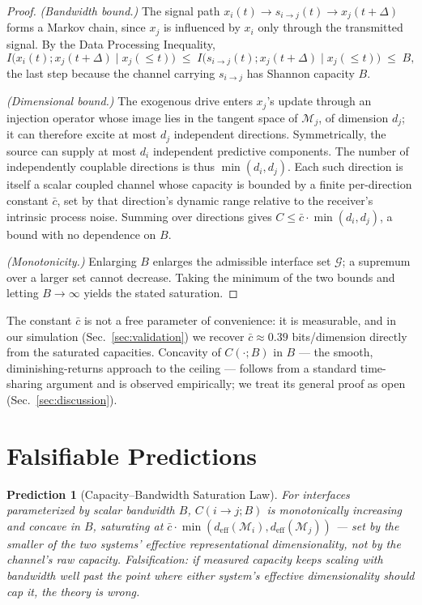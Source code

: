 \documentclass[11pt]{article}
\newtheorem{prediction}{Prediction}
\begin{document}
\begin{proof}[Proof]
\emph{(Bandwidth bound.)} The signal path $x_i(t) \to s_{i\to j}(t) \to x_j(t+\Delta)$ forms a Markov chain, since $x_j$ is influenced by $x_i$ only through the transmitted signal. By the Data Processing Inequality,
\[
I\big(x_i(t); x_j(t{+}\Delta)\mid x_j(\le t)\big) \;\le\; I\big(s_{i\to j}(t); x_j(t{+}\Delta)\mid x_j(\le t)\big) \;\le\; B,
\]
the last step because the channel carrying $s_{i\to j}$ has Shannon capacity $B$.

\emph{(Dimensional bound.)} The exogenous drive enters $x_j$'s update through an injection operator whose image lies in the tangent space of $\mathcal{M}_j$, of dimension $d_j$; it can therefore excite at most $d_j$ independent directions. Symmetrically, the source can supply at most $d_i$ independent predictive components. The number of independently couplable directions is thus $\min(d_i,d_j)$. Each such direction is itself a scalar coupled channel whose capacity is bounded by a finite per-direction constant $\bar{c}$, set by that direction's dynamic range relative to the receiver's intrinsic process noise. Summing over directions gives $C \le \bar{c}\cdot\min(d_i,d_j)$, a bound with no dependence on $B$.

\emph{(Monotonicity.)} Enlarging $B$ enlarges the admissible interface set $\mathcal{G}$; a supremum over a larger set cannot decrease. Taking the minimum of the two bounds and letting $B \to \infty$ yields the stated saturation.
\end{proof}

\noindent The constant $\bar{c}$ is not a free parameter of convenience: it is measurable, and in our simulation (Sec.~\ref{sec:validation}) we recover $\bar{c} \approx 0.39$ bits/dimension directly from the saturated capacities. Concavity of $C(\cdot;B)$ in $B$ --- the smooth, diminishing-returns approach to the ceiling --- follows from a standard time-sharing argument and is observed empirically; we treat its general proof as open (Sec.~\ref{sec:discussion}).

\section{Falsifiable Predictions}
\label{sec:predictions}

\begin{prediction}[Capacity--Bandwidth Saturation Law]
For interfaces parameterized by scalar bandwidth $B$, $C(i \to j; B)$ is monotonically increasing and concave in $B$, saturating at $\bar{c}\cdot\min(d_{\mathrm{eff}}(\mathcal{M}_i), d_{\mathrm{eff}}(\mathcal{M}_j))$ --- set by the smaller of the two systems' \emph{effective} representational dimensionality, not by the channel's raw capacity. Falsification: if measured capacity keeps scaling with bandwidth well past the point where either system's effective dimensionality should cap it, the theory is wrong.
\end{prediction}
\end{document}
